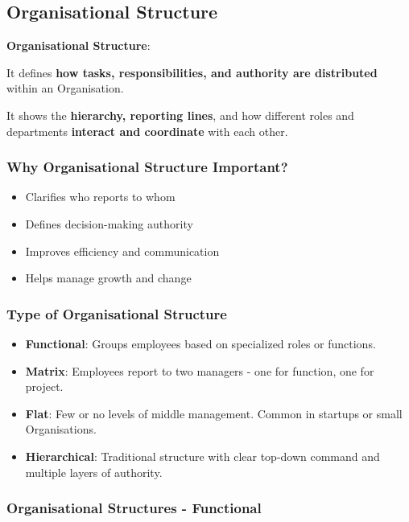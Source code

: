 \subsection{Organisational Structure}

\textbf{Organisational Structure}: 

It defines \textbf{how tasks, responsibilities, and authority are distributed} within an Organisation. 

It shows the \textbf{hierarchy, reporting lines}, and how different roles and departments \textbf{interact and coordinate} with each other.

\subsubsection{Why Organisational Structure Important?}

\begin{itemize}
    \item Clarifies who reports to whom
    \item Defines decision-making authority
    \item Improves efficiency and communication
    \item Helps manage growth and change
\end{itemize}

\subsubsection{Type of Organisational Structure}

\begin{itemize}
    \item \textbf{Functional}: Groups employees based on specialized roles or functions.
    \item \textbf{Matrix}: Employees report to two managers - one for function, one for project.
    \item \textbf{Flat}: Few or no levels of middle management. Common in startups or small Organisations.
    \item \textbf{Hierarchical}: Traditional structure with clear top-down command and multiple layers of authority.
\end{itemize}

\subsubsection{Organisational Structures - Functional}

